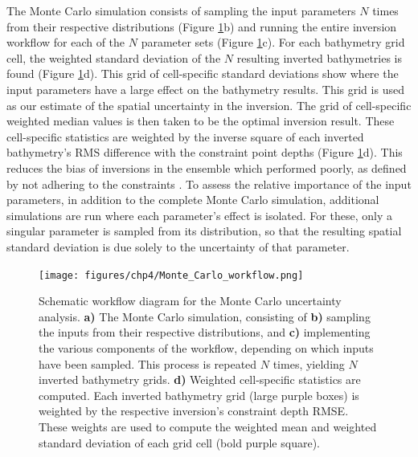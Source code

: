 The Monte Carlo simulation consists of sampling the input parameters $N$ times from their respective distributions (Figure \ref{fig:chp4_Monte_Carlo_workflow}b) and running the entire inversion workflow for each of the $N$ parameter sets (Figure \ref{fig:chp4_Monte_Carlo_workflow}c). For each bathymetry grid cell, the weighted standard deviation of the $N$ resulting inverted bathymetries is found (Figure \ref{fig:chp4_Monte_Carlo_workflow}d). This grid of cell-specific standard deviations show where the input parameters have a large effect on the bathymetry results. This grid is used as our estimate of the spatial uncertainty in the inversion. The grid of cell-specific weighted median values is then taken to be the optimal inversion result. These cell-specific statistics are weighted by the inverse square of each inverted bathymetry's RMS difference with the constraint point depths (Figure \ref{fig:chp4_Monte_Carlo_workflow}d). This reduces the bias of inversions in the ensemble which performed poorly, as defined by not adhering to the constraints \citep{schnaidtbootstrap2015}. To assess the relative importance of the input parameters, in addition to the complete Monte Carlo simulation, additional simulations are run where each parameter's effect is isolated. For these, only a singular parameter is sampled from its distribution, so that the resulting spatial standard deviation is due solely to the uncertainty of that parameter.\\

\begin{figure}[!ht]
    \centering
    \texttt{[image: figures/chp4/Monte\_Carlo\_workflow.png]}
    \caption[Schematic Monte Carlo workflow diagram]{Schematic workflow diagram for the Monte Carlo uncertainty analysis. \textbf{a)} The Monte Carlo simulation, consisting of \textbf{b)} sampling the inputs from their respective distributions, and \textbf{c)} implementing the various components of the workflow, depending on which inputs have been sampled. This process is repeated $N$ times, yielding $N$ inverted bathymetry grids. \textbf{d)} Weighted cell-specific statistics are computed. Each inverted bathymetry grid (large purple boxes) is weighted by the respective inversion's constraint depth RMSE. These weights are used to compute the weighted mean and weighted standard deviation of each grid cell (bold purple square).}
    \label{fig:chp4_Monte_Carlo_workflow}
\end{figure}

